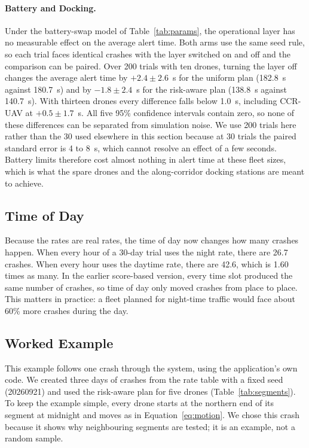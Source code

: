 \documentclass[11pt]{article}
\begin{document}
\paragraph{Battery and Docking.}
Under the battery-swap model of Table~\ref{tab:params}, the operational layer
has no measurable effect on the average alert time. Both arms use the same
seed rule, so each trial faces identical crashes with the layer switched on
and off and the comparison can be paired. Over 200 trials with ten drones,
turning the layer off changes the average alert time by $+2.4\pm2.6$~s for
the uniform plan (182.8~s against 180.7~s) and by $-1.8\pm2.4$~s for the
risk-aware plan (138.8~s against 140.7~s). With thirteen drones every
difference falls below 1.0~s, including CCR-UAV at $+0.5\pm1.7$~s. All five
95\% confidence intervals contain zero, so none of these differences can be
separated from simulation noise. We use 200 trials here rather than the 30
used elsewhere in this section because at 30 trials the paired standard error
is 4 to 8~s, which cannot resolve an effect of a few seconds. Battery limits
therefore cost almost nothing in alert time at these fleet sizes, which is
what the spare drones and the along-corridor docking stations are meant to
achieve.

\subsection{Time of Day}

Because the rates are real rates, the time of day now changes how many crashes
happen. When every hour of a 30-day trial uses the night rate, there are 26.7
crashes. When every hour uses the daytime rate, there are 42.6, which is 1.60
times as many. In the earlier score-based version, every time slot produced the
same number of crashes, so time of day only moved crashes from place to place.
This matters in practice: a fleet planned for night-time traffic would face
about 60\% more crashes during the day.

\subsection{Worked Example}
\label{sec:worked}

This example follows one crash through the system, using the application's own
code. We created three days of crashes from the rate table with a fixed seed
(20260921) and used the risk-aware plan for five drones
(Table~\ref{tab:segments}). To keep the example simple, every drone starts at
the northern end of its segment at midnight and moves as in
Equation~\eqref{eq:motion}. We chose this crash because it shows why neighbouring
segments are tested; it is an example, not a random sample.
\end{document}
